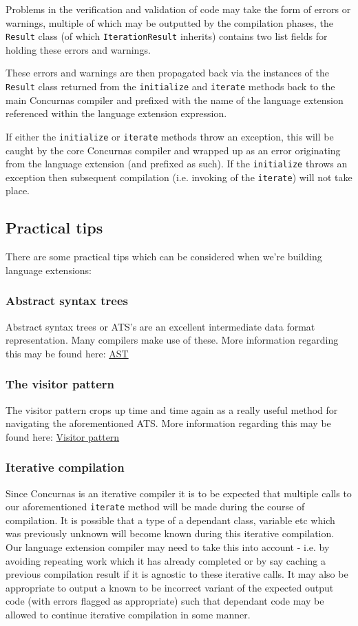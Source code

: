 \documentclass[conc-doc]{subfiles}
\begin{document}
Problems in the verification and validation of code may take the form of errors or warnings, multiple of which may be outputted by the compilation phases, the \lstinline{Result} class (of which \lstinline{IterationResult} inherits) contains two list fields for holding these errors and warnings.

These errors and warnings are then propagated back via the instances of the \lstinline{Result} class returned from the \lstinline{initialize} and \lstinline{iterate} methods back to the main Concurnas compiler and prefixed with the name of the language extension referenced within the language extension expression.

If either the \lstinline{initialize} or \lstinline{iterate} methods throw an exception, this will be caught by the core Concurnas compiler and wrapped up as an error originating from the language extension (and prefixed as such). If the \lstinline{initialize} throws an exception then subsequent compilation (i.e. invoking of the \lstinline{iterate}) will not take place.

\subsection{Practical tips}
There are some practical tips which can be considered when we're building language extensions:

\subsubsection{Abstract syntax trees}
Abstract syntax trees or ATS's are an excellent intermediate data format representation. Many compilers make use of these. More information regarding this may be found here: \href{https://en.wikipedia.org/wiki/Abstract_syntax_tree}{AST}

\subsubsection{The visitor pattern}
The visitor pattern crops up time and time again as a really useful method for navigating the aforementioned ATS. More information regarding this may be found here: \href{https://en.wikipedia.org/wiki/Visitor_pattern}{Visitor pattern}

\subsubsection{Iterative compilation}
Since Concurnas is an iterative compiler it is to be expected that multiple calls to our aforementioned \lstinline{iterate} method will be made during the course of compilation. It is possible that a type of a dependant class, variable etc which was previously unknown will become known during this iterative compilation. Our language extension compiler may need to take this into account - i.e. by avoiding repeating work which it has already completed or by say caching a previous compilation result if it is agnostic to these iterative calls. It may also be appropriate to output a known to be incorrect variant of the expected output code (with errors flagged as appropriate) such that dependant code may be allowed to continue iterative compilation in some manner.
\end{document}
